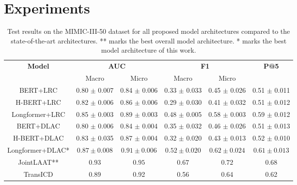 \documentclass[11pt]{article}
\begin{document}
\section{Experiments}
\begin{table*}
\centering
\begin{tabular}{cccccc}
\hline
\multirow{2}{*}{\textbf{Model}} &
     \multicolumn{2}{c}{\textbf{AUC}} &
     \multicolumn{2}{c}{\textbf{F1}} &{\textbf{P@5}} \\
     & Macro & Micro & Macro & Micro \\
\hline
BERT+LRC  & 0.80 $\pm$ 0.007  & 0.84 $\pm$ 0.006 & 0.33 $\pm$ 0.033 & 0.45 $\pm$ 0.026 & 0.51 $\pm$ 0.011 \\
H-BERT+LRC  & 0.82 $\pm$ 0.006 & 0.86 $\pm$ 0.006 & 0.29 $\pm$ 0.030 & 0.41 $\pm$ 0.032 & 0.51 $\pm$ 0.012\\
Longformer+LRC  & 0.85 $\pm$ 0.003 & 0.89 $\pm$ 0.003  & 0.48 $\pm$ 0.005  & 0.58 $\pm$ 0.003  & 0.59 $\pm$ 0.012 \\
BERT+DLAC & 0.80 $\pm$ 0.006  & 0.84 $\pm$ 0.004 & 0.35 $\pm$ 0.032  & 0.46 $\pm$ 0.026 & 0.51 $\pm$ 0.013\\
H-BERT+DLAC & 0.83 $\pm$ 0.035  & 0.87 $\pm$ 0.004 & 0.32 $\pm$ 0.020 & 0.43 $\pm$ 0.013 & 0.52 $\pm$ 0.010 \\
Longformer+DLAC* & $0.87 \pm 0.008$ & $0.91 \pm 0.006$ & $0.52 \pm 0.020$ & $0.62  \pm 0.024$ &  $0.61 \pm 0.013$\\
\hline\hline
JointLAAT** & $\mathbf{0.93}$ & $\mathbf{0.95} $ & $\mathbf{0.67} $ & $\mathbf{0.72} $ & $\mathbf{0.68}$\\
TransICD & 0.89 & 0.92 & 0.56 & 0.64 &  0.62 \\
\hline
\end{tabular}
\caption{
Test results on the MIMIC-III-50 dataset for all proposed model architectures compared to the state-of-the-art architectures. ** marks the best overall model architecture. * marks the best model architecture of this work.
}
\label{tab:test_results}
\end{table*}
\end{document}
